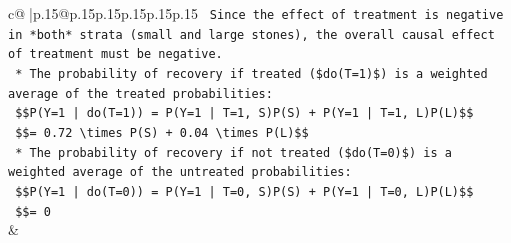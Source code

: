 \documentclass{article}
\begin{document}
{\begin{supertabular}{c@{$\;$}|p{.15\linewidth}@{}p{.15\linewidth}p{.15\linewidth}p{.15\linewidth}p{.15\linewidth}p{.15\linewidth}}
{{{\texttt{    Since the effect of treatment is negative in *both* strata (small and large stones), the overall causal effect of treatment must be negative.} \\
\texttt{    *   The probability of recovery if treated (\$do(T=1)\$) is a weighted average of the treated probabilities:} \\
\texttt{        \$\$P(Y=1 | do(T=1)) = P(Y=1 | T=1, S)P(S) + P(Y=1 | T=1, L)P(L)\$\$} \\
\texttt{        \$\$= 0.72 \textbackslash{}times P(S) + 0.04 \textbackslash{}times P(L)\$\$} \\
\texttt{    *   The probability of recovery if not treated (\$do(T=0)\$) is a weighted average of the untreated probabilities:} \\
\texttt{        \$\$P(Y=1 | do(T=0)) = P(Y=1 | T=0, S)P(S) + P(Y=1 | T=0, L)P(L)\$\$} \\
\texttt{        \$\$= 0} \\
            }
        }
    }
    & \\ \\


\end{supertabular}}
\end{document}

